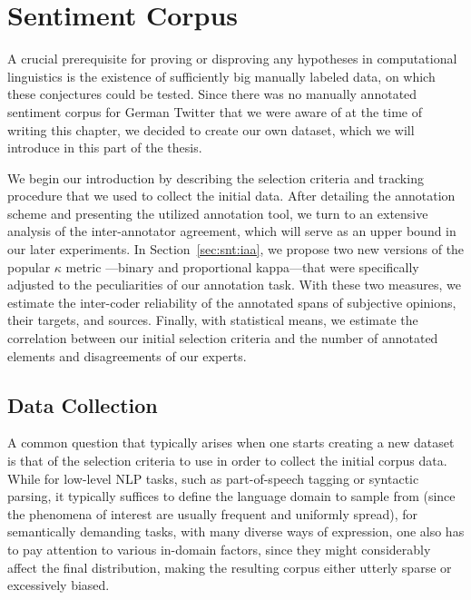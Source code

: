 

\chapter{Sentiment Corpus}\label{chap:corpus}

A crucial prerequisite for proving or disproving any hypotheses in
computational linguistics is the existence of sufficiently big
manually labeled data, on which these conjectures could be tested.
Since there was no manually annotated sentiment corpus for German
Twitter that we were aware of at the time of writing this chapter, we
decided to create our own dataset, which we will introduce in this
part of the thesis.

We begin our introduction by describing the selection criteria and
tracking procedure that we used to collect the initial data.  After
detailing the annotation scheme and presenting the utilized annotation
tool, we turn to an extensive analysis of the inter-annotator
agreement, which will serve as an upper bound in our later
experiments.  In Section~\ref{sec:snt:iaa}, we propose two new
versions of the popular $\kappa$ metric \cite{Cohen:60}---binary and
proportional kappa---that were specifically adjusted to the
peculiarities of our annotation task.  With these two measures, we
estimate the inter-coder reliability of the annotated spans of
subjective opinions, their targets, and sources.  Finally, with
statistical means, we estimate the correlation between our initial
selection criteria and the number of annotated elements and
disagreements of our experts.

\section{Data Collection}

A common question that typically arises when one starts creating a new
dataset is that of the selection criteria to use in order to collect
the initial corpus data.  While for low-level NLP tasks, such as
part-of-speech tagging or syntactic parsing, it typically suffices to
define the language domain to sample from (since the phenomena of
interest are usually frequent and uniformly spread), for semantically
demanding tasks, with many diverse ways of expression, one also has to
pay attention to various in-domain factors, since they might
considerably affect the final distribution, making the resulting
corpus either utterly sparse or excessively biased.

